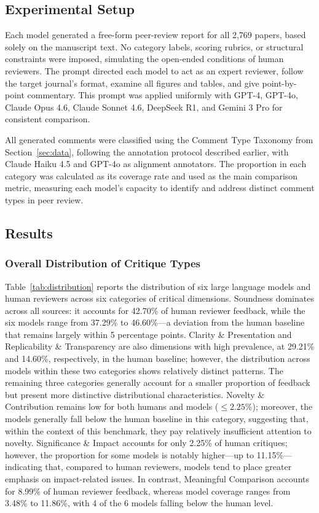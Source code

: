 \documentclass[preprint,10pt,times]{elsarticle}
\begin{document}
\subsection{Experimental Setup}
\label{sec:t1-setup}

Each model generated a free-form peer-review report for all 2,769 papers, based solely on the manuscript text. No category labels, scoring rubrics, or structural constraints were imposed, simulating the open-ended conditions of human reviewers. The prompt directed each model to act as an expert reviewer, follow the target journal's format, examine all figures and tables, and give point-by-point commentary. This prompt was applied uniformly with GPT-4, GPT-4o, Claude Opus 4.6, Claude Sonnet 4.6, DeepSeek R1, and Gemini 3 Pro for consistent comparison.

All generated comments were classified using the Comment Type Taxonomy from Section~\ref{sec:data}, following the annotation protocol described earlier, with Claude Haiku 4.5 and GPT-4o as alignment annotators. The proportion in each category was calculated as its coverage rate and used as the main comparison metric, measuring each model's capacity to identify and address distinct comment types in peer review.

\subsection{Results}
\label{sec:t1-results}

\subsubsection{Overall Distribution of Critique Types}

Table~\ref{tab:distribution} reports the distribution of six large language models and human reviewers across six categories of critical dimensions. Soundness dominates across all sources: it accounts for 42.70\% of human reviewer feedback, while the six models range from 37.29\% to 46.60\%---a deviation from the human baseline that remains largely within 5 percentage points. Clarity \& Presentation and Replicability \& Transparency are also dimensions with high prevalence, at 29.21\% and 14.60\%, respectively, in the human baseline; however, the distribution across models within these two categories shows relatively distinct patterns. The remaining three categories generally account for a smaller proportion of feedback but present more distinctive distributional characteristics. Novelty \& Contribution remains low for both humans and models ($\leq 2.25\%$); moreover, the models generally fall below the human baseline in this category, suggesting that, within the context of this benchmark, they pay relatively insufficient attention to novelty. Significance \& Impact accounts for only 2.25\% of human critiques; however, the proportion for some models is notably higher---up to 11.15\%---indicating that, compared to human reviewers, models tend to place greater emphasis on impact-related issues. In contrast, Meaningful Comparison accounts for 8.99\% of human reviewer feedback, whereas model coverage ranges from 3.48\% to 11.86\%, with 4 of the 6 models falling below the human level.
\end{document}
